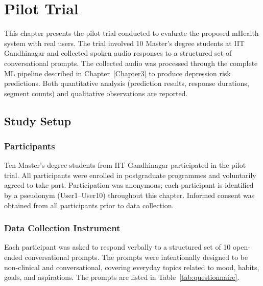 \chapter{Pilot Trial}
\label{Chapter5}

This chapter presents the pilot trial conducted to evaluate the proposed mHealth system with real users. The trial involved 10 Master's degree students at IIT Gandhinagar and collected spoken audio responses to a structured set of conversational prompts. The collected audio was processed through the complete ML pipeline described in Chapter~\ref{Chapter3} to produce depression risk predictions. Both quantitative analysis (prediction results, response durations, segment counts) and qualitative observations are reported.

\section{Study Setup}

\subsection{Participants}

Ten Master's degree students from IIT Gandhinagar participated in the pilot trial. All participants were enrolled in postgraduate programmes and voluntarily agreed to take part. Participation was anonymous; each participant is identified by a pseudonym (User1–User10) throughout this chapter. Informed consent was obtained from all participants prior to data collection.

\subsection{Data Collection Instrument}

Each participant was asked to respond verbally to a structured set of 10 open-ended conversational prompts. The prompts were intentionally designed to be non-clinical and conversational, covering everyday topics related to mood, habits, goals, and aspirations. The prompts are listed in Table~\ref{tab:questionnaire}.

